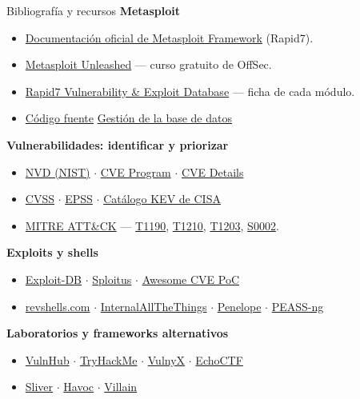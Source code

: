 \documentclass[aspectratio=169,11pt]{beamer}
\newcommand{\lead}[1]{{\color{uznavy}\bfseries #1}\par\smallskip}
\begin{document}
\begin{frame}{Bibliografía y recursos}
\footnotesize
\lead{Metasploit}
  \begin{itemize}
  \item \href{https://docs.metasploit.com/}{Documentación oficial de Metasploit Framework} (Rapid7).
  \item \href{https://www.offsec.com/metasploit-unleashed/}{Metasploit Unleashed} --- curso gratuito de OffSec.
  \item \href{https://www.rapid7.com/db/}{Rapid7 Vulnerability \& Exploit Database} --- ficha de cada módulo.
  \item \href{https://github.com/rapid7/metasploit-framework}{Código fuente} \textbar{} \href{https://docs.rapid7.com/metasploit/managing-the-database/}{Gestión de la base de datos}
  \end{itemize}
\lead{Vulnerabilidades: identificar y priorizar}
  \begin{itemize}
  \item \href{https://nvd.nist.gov/}{NVD (NIST)} $\cdot$ \href{https://www.cve.org/}{CVE Program} $\cdot$ \href{https://www.cvedetails.com/}{CVE Details}
  \item \href{https://www.first.org/cvss/}{CVSS} $\cdot$ \href{https://www.first.org/epss/}{EPSS} $\cdot$ \href{https://www.cisa.gov/known-exploited-vulnerabilities-catalog}{Catálogo KEV de CISA}
  \item \href{https://attack.mitre.org/}{MITRE ATT\&CK} --- \href{https://attack.mitre.org/techniques/T1190/}{T1190}, \href{https://attack.mitre.org/techniques/T1210/}{T1210}, \href{https://attack.mitre.org/techniques/T1203/}{T1203}, \href{https://attack.mitre.org/software/S0002/}{S0002}.
  \end{itemize}
\lead{Exploits y shells}
  \begin{itemize}
  \item \href{https://www.exploit-db.com/}{Exploit-DB} $\cdot$ \href{https://sploitus.com/}{Sploitus} $\cdot$ \href{https://github.com/qazbnm456/awesome-cve-poc}{Awesome CVE PoC}
  \item \href{https://www.revshells.com/}{revshells.com} $\cdot$ \href{https://swisskyrepo.github.io/InternalAllTheThings/cheatsheets/shell-reverse-cheatsheet/}{InternalAllTheThings} $\cdot$ \href{https://github.com/brightio/penelope}{Penelope} $\cdot$ \href{https://github.com/peass-ng/PEASS-ng}{PEASS-ng}
  \end{itemize}
\lead{Laboratorios y frameworks alternativos}
  \begin{itemize}
  \item \href{https://www.vulnhub.com/}{VulnHub} $\cdot$ \href{https://tryhackme.com/}{TryHackMe} $\cdot$ \href{https://vulnyx.com/}{VulnyX} $\cdot$ \href{https://echoctf.red/}{EchoCTF}
  \item \href{https://github.com/BishopFox/sliver}{Sliver} $\cdot$ \href{https://github.com/HavocFramework/Havoc}{Havoc} $\cdot$ \href{https://github.com/t3l3machus/Villain}{Villain}
  \end{itemize}
\end{frame}
\end{document}
